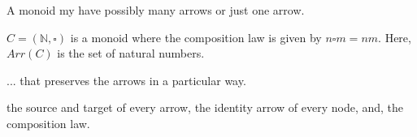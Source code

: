 A monoid my have possibly many arrows or just one arrow. 

\begin{example}
$C = (\mathbb{N}, \square)$ is a monoid where the composition law is given by $n \square m = nm$.
Here, $Arr(C)$ is the set of natural numbers. 

\end{example}


... that preserves the arrows in a particular way. 

the source and target of every arrow, the identity arrow of every node, 
and, the composition law.


